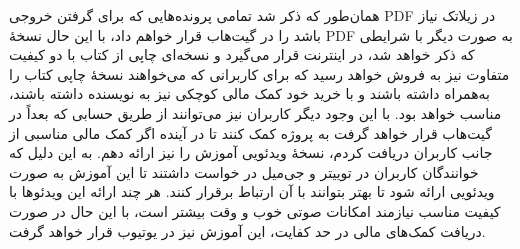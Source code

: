 همان‌طور که ذکر شد تمامی پرونده‌هایی که برای گرفتن خروجی PDF در زیلاتک نیاز باشد را در گیت‌هاب قرار خواهم داد، با این حال نسخهٔ PDF به صورت دیگر با شرایطی که ذکر خواهد شد، در اینترنت قرار می‌گیرد و نسخه‌ای چاپی از کتاب با دو کیفیت متفاوت نیز به فروش خواهد رسید که برای کاربرانی که می‌خواهند نسخهٔ چاپی کتاب را به‌همراه داشته باشند و با خرید خود کمک مالی کوچکی نیز به نویسنده داشته باشند، مناسب خواهد بود. با این وجود  دیگر کاربران نیز می‌توانند از طریق حسابی که بعداً در گیت‌هاب قرار خواهد گرفت به پروژه کمک کنند تا در آینده اگر کمک مالی مناسبی از جانب کاربران دریافت کردم، نسخهٔ ویدئویی آموزش را نیز ارائه دهم. به این دلیل که خوانندگان کاربران در توییتر و جی‌میل در خواست داشتند تا این آموزش به صورت ویدئویی ارائه شود تا بهتر بتوانند با آن ارتباط برقرار کنند. هر چند ارائه این ویدئوها با کیفیت مناسب نیازمند امکانات صوتی خوب و وقت بیشتر است، با این حال در صورت دریافت کمک‌های مالی در حد کفایت، این آموزش نیز در یوتیوب قرار خواهد گرفت.
